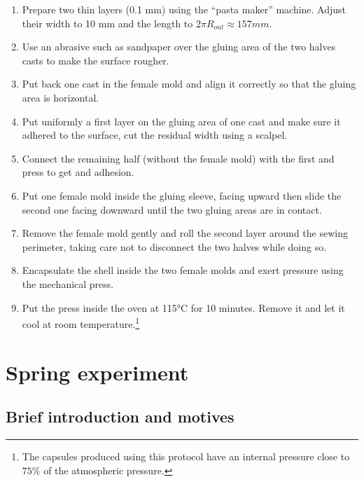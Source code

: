 \begin{enumerate}
	\item Prepare two thin layers (0.1 mm) using the "`pasta maker"' machine. Adjust their width to 10 mm and the length to $2\pi R_{out} \approx 157 mm$.
	\item Use an abrasive such as sandpaper over the gluing area of the two halves casts to make the surface rougher.
	\item Put back one cast in the female mold and align it correctly so that the gluing area is horizontal.
	\item Put uniformly a first layer on the gluing area of one cast and make sure it adhered to the surface, cut the residual width using a scalpel.
	\item Connect the remaining half (without the female mold) with the first and press to get and adhesion.
	\item Put one female mold inside the gluing sleeve, facing upward then slide the second one facing downward until the two gluing areas are in contact.
	\item Remove the female mold gently and roll the second layer around the sewing perimeter, taking care not to disconnect the two halves while doing so.
	\item Encapsulate the shell inside the two female molds and exert pressure using the mechanical press.
	\item Put the press inside the oven at 115°C for 10 minutes. Remove it and let it cool at room temperature.\footnote{The capsules produced using this protocol have an internal pressure close to $75\%$ of the atmospheric pressure.}
\end{enumerate}
\newpage
\section{Spring experiment}
\subsection{Brief introduction and motives}

